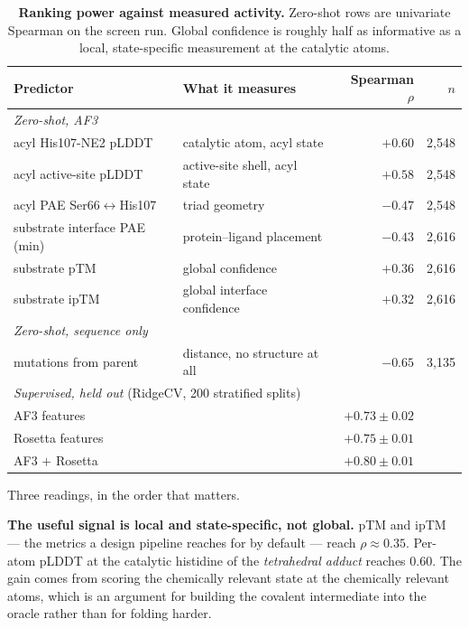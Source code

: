 \begin{table}[h]
  \centering
  \small
  \begin{tabular}{llrr}
    \toprule
    Predictor & What it measures & Spearman $\rho$ & $n$ \\
    \midrule
    \multicolumn{4}{l}{\emph{Zero-shot, AF3}} \\
    \quad acyl His107-NE2 pLDDT      & catalytic atom, acyl state & $+0.60$ & 2{,}548 \\
    \quad acyl active-site pLDDT     & active-site shell, acyl state & $+0.58$ & 2{,}548 \\
    \quad acyl PAE Ser66$\leftrightarrow$His107 & triad geometry & $-0.47$ & 2{,}548 \\
    \quad substrate interface PAE (min) & protein--ligand placement & $-0.43$ & 2{,}616 \\
    \quad substrate pTM               & global confidence & $+0.36$ & 2{,}616 \\
    \quad substrate ipTM              & global interface confidence & $+0.32$ & 2{,}616 \\
    \midrule
    \multicolumn{4}{l}{\emph{Zero-shot, sequence only}} \\
    \quad mutations from parent      & distance, no structure at all & $-0.65$ & 3{,}135 \\
    \midrule
    \multicolumn{4}{l}{\emph{Supervised, held out} (RidgeCV, 200 stratified splits)} \\
    \quad AF3 features               & & $+0.73 \pm 0.02$ & \\
    \quad Rosetta features           & & $+0.75 \pm 0.01$ & \\
    \quad AF3 $+$ Rosetta            & & $+0.80 \pm 0.01$ & \\
    \bottomrule
  \end{tabular}
  \caption{\textbf{Ranking power against measured activity.} Zero-shot rows are
  univariate Spearman on the screen run. Global confidence is roughly half as
  informative as a local, state-specific measurement at the catalytic atoms.}
  \label{tab:petase-zeroshot}
\end{table}

Three readings, in the order that matters.

\textbf{The useful signal is local and state-specific, not global.} pTM and ipTM
--- the metrics a design pipeline reaches for by default --- reach $\rho \approx
0.35$. Per-atom pLDDT at the catalytic histidine of the \emph{tetrahedral
adduct} reaches $0.60$. The gain comes from scoring the chemically
relevant state at the chemically relevant atoms, which is an argument for
building the covalent intermediate into the oracle rather than for folding
harder.

